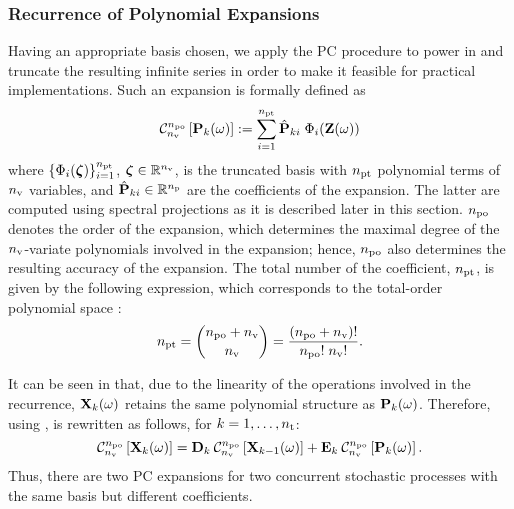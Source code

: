 \subsubsection{Recurrence of Polynomial Expansions}
Having an appropriate basis chosen, we apply the PC procedure to power in  and truncate the resulting infinite series in order to make it feasible for practical implementations. Such an expansion is formally defined as
\begin{equation} \elabel{pc-expansion}
  \oPC{\nvars}{\pcorder}{\vP_k(\o)} := \sum_{i = 1}^{\pcterms} \pcc{\vP}_{ki} \; \pcb_i(\vZ(\o))
\end{equation}
where $\{ \Phi_i(\boldsymbol{\zeta}) \}_{i = 1}^{{n_\text{pt}}}$, $\boldsymbol{\zeta} \in \mathbb{R}^{n_\text{v}}$, is the truncated basis with ${n_\text{pt}}$ polynomial terms of ${n_\text{v}}$ variables, and $\hat{\mathbf{P}}_{ki} \in \mathbb{R}^{n_\text{p}}$ are the coefficients of the expansion.
The latter are computed using spectral projections as it is described later in this section.
${n_\text{po}}$ denotes the order of the expansion, which determines the maximal degree of the ${n_\text{v}}$-variate polynomials involved in the expansion; hence, ${n_\text{po}}$ also determines the resulting accuracy of the expansion.
The total number of the coefficient, ${n_\text{pt}}$, is given by the following expression, which corresponds to the total-order polynomial space \cite{eldred2008, beck2011}:
\begin{equation} \elabel{pc-terms}
  \pcterms = { \pcorder + \nvars \choose \nvars } = \frac{(\pcorder + \nvars)!}{\pcorder! \; \nvars!}.
\end{equation}

It can be seen in  that, due to the linearity of the operations involved in the recurrence, $\mathbf{X}_k(\omega)$ retains the same polynomial structure as $\mathbf{P}_k(\omega)$. Therefore, using ,  is rewritten as follows, for $k = 1, \dotsc, {n_\text{t}}$:
\begin{equation} \elabel{expanded-recurrence}
  \oPC{\nvars}{\pcorder}{\vX_k(\o)} = \mCF_k \: \oPC{\nvars}{\pcorder}{\vX_{k-1}(\o)} + \mCS_k \: \oPC{\nvars}{\pcorder}{\vP_k(\o)}.
\end{equation}
Thus, there are two PC expansions for two concurrent stochastic processes with the same basis but different coefficients.

